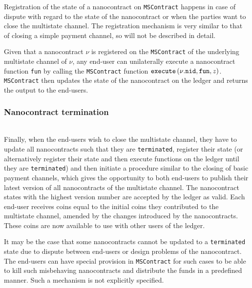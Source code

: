     Registration of the state of a nanocontract on \texttt{MSContract} happens in case of
    dispute with regard to the state of the nanocontract or when the parties want to close
    the multistate channel. The registration mechanism is very similar to that of closing
    a simple payment channel, so will not be described in detail.

    Given that a nanocontract $\nu$ is registered on the \texttt{MSContract} of the
    underlying multistate channel of $\nu$, any end-user can unilaterally execute a
    nanocontract function \texttt{fun} by calling the \texttt{MSContract} function
    $\mbox{\texttt{execute}}\left(\nu\mbox{.\texttt{nid}}, \mbox{\texttt{fun}}, z\right)$.
    \texttt{MSContract} then updates the state of the nano\-contract on the ledger and
    returns the output to the end-users.

  \subsubsection{Nanocontract termination} \ \\

    Finally, when the end-users wish to close the multistate channel, they have to update
    all nanocontracts such that they are \texttt{terminated}, register their state (or
    alternatively register their state and then execute functions on the ledger until they
    are \texttt{terminated}) and then initiate a procedure similar to the closing of basic
    payment channels, which gives the opportunity to both end-users to publish their
    latest version of all nanocontracts of the multistate channel. The nanocontract states
    with the highest version number are accepted by the ledger as valid. Each end-user
    receives coins equal to the initial coins they contributed to the multistate channel,
    amended by the changes introduced by the nanocontracts. These coins are now available
    to use with other users of the ledger.

    It may be the case that some nanocontracts cannot be updated to a \texttt{terminated}
    state due to dispute between end-users or design problems of the nanocontract. The
    end-users can have special provision in \texttt{MSContract} for such cases to be able
    to kill such misbehaving nanocontracts and distribute the funds in a predefined
    manner. Such a mechanism is not explicitly specified.
